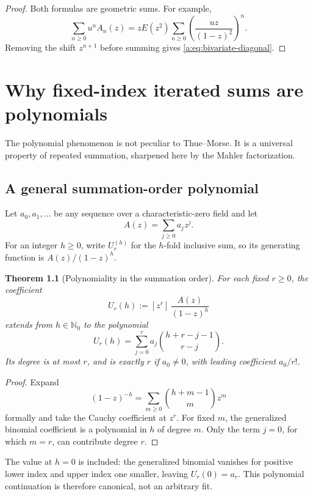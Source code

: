 \documentclass[11pt,a4paper,oneside,openany]{book}
\numberwithin{equation}{chapter}
\newtheorem{theorem}{Theorem}[chapter]
\theoremstyle{definition}
\theoremstyle{remark}
\newcommand{\Nzero}{\mathbb N_0}
\newcommand{\coeff}[2]{[z^{#1}]\,#2}
\begin{document}
\begin{proof}
Both formulas are geometric sums.  For example,
\[
 \sum_{n\ge0}u^nA_n(z)
 =zE(z^2)\sum_{n\ge0}
 \left(\frac{uz}{(1-z)^2}\right)^n.
\]
Removing the shift \(z^{n+1}\) before summing gives
\eqref{a:eq:bivariate-diagonal}.
\end{proof}
\chapter{Why fixed-index iterated sums are polynomials}\label{ch:polynomiality}

The polynomial phenomenon is not peculiar to Thue--Morse.  It is a universal
property of repeated summation, sharpened here by the Mahler factorization.

\section{A general summation-order polynomial}

Let \(a_0,a_1,\ldots\) be any sequence over a characteristic-zero field and
let
\[
 A(z)=\sum_{j\ge0}a_jz^j.
\]
For an integer \(h\ge0\), write \(U_r^{(h)}\) for the \(h\)-fold inclusive
sum, so its generating function is \(A(z)/(1-z)^h\).

\begin{theorem}[Polynomiality in the summation order]
For each fixed \(r\ge0\), the coefficient
\begin{equation}
 U_r(h):=\coeff{r}{\frac{A(z)}{(1-z)^h}}
 \label{a:eq:general-U}
\end{equation}
extends from \(h\in\Nzero\) to the polynomial
\begin{equation}
 \boxed{
 U_r(h)=\sum_{j=0}^{r}a_j
 \binom{h+r-j-1}{r-j}.}
 \label{a:eq:general-order-polynomial}
\end{equation}
Its degree is at most \(r\), and is exactly \(r\) if \(a_0\ne0\), with
leading coefficient \(a_0/r!\).
\end{theorem}

\begin{proof}
Expand
\[
 (1-z)^{-h}=\sum_{m\ge0}\binom{h+m-1}{m}z^m
\]
formally and take the Cauchy coefficient at \(z^r\).  For fixed \(m\), the
generalized binomial coefficient is a polynomial in \(h\) of degree \(m\).
Only the term \(j=0\), for which \(m=r\), can contribute degree \(r\).
\end{proof}

The value at \(h=0\) is included: the generalized binomial vanishes for
positive lower index and upper index one smaller, leaving \(U_r(0)=a_r\).
This polynomial continuation is therefore canonical, not an arbitrary fit.
\end{document}
